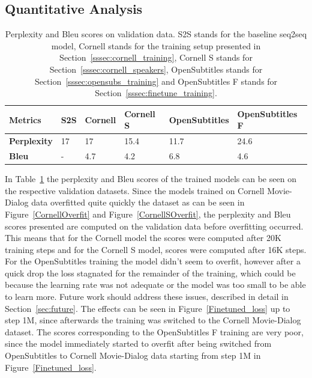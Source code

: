 \documentclass[12pt]{article}
\begin{document}
\subsection{Quantitative Analysis} \label{ssec:51}
\begin{table}[H]
	\centering
	\begin{tabular}{|l|l|l|l|l|l|}
		\hline
		\textbf{Metrics} & \textbf{S2S} & \textbf{Cornell} & \textbf{Cornell S} & \textbf{OpenSubtitles} & \textbf{OpenSubtitles F}\\ \hline
		\textbf{Perplexity} & 17 & 17 & 15.4 & 11.7 & 24.6
		\\ \hline
		\textbf{Bleu} & - & 4.7 & 4.2 & 6.8 & 4.6
		\\ \hline
	\end{tabular}
	\caption{Perplexity and Bleu scores on validation data. S2S stands for the baseline seq2seq model, Cornell stands for the training setup presented in Section~\ref{sssec:cornell_training}, Cornell S stands for Section~\ref{sssec:cornell_speakers}, OpenSubtitles stands for Section~\ref{sssec:opensubs_training} and OpenSubtitles F stands for Section~\ref{sssec:finetune_training}.}	
	\label{table:scores}
\end{table}
In Table~\ref{table:scores} the perplexity and Bleu scores of the trained models can be seen on the respective validation datasets. Since the models trained on Cornell Movie-Dialog data overfitted quite quickly the dataset as can be seen in Figure~\ref{CornellOverfit} and Figure~\ref{CornellSOverfit}, the perplexity and Bleu scores presented are computed on the validation data before overfitting occurred. This means that for the Cornell model the scores were computed after 20K training steps and for the Cornell S model, scores were computed after 16K steps. For the OpenSubtitles training the model didn't seem to overfit, however after a quick drop the loss stagnated for the remainder of the training, which could be because the learning rate was not adequate or the model was too small to be able to learn more. Future work should address these issues, described in detail in Section~\ref{sec:future}. The effects can be seen in Figure~\ref{Finetuned_loss} up to step 1M, since afterwards the training was switched to the Cornell Movie-Dialog dataset. The scores corresponding to the OpenSubtitles F training are very poor, since the model immediately started to overfit after being switched from OpenSubtitles to Cornell Movie-Dialog data starting from step 1M in Figure~\ref{Finetuned_loss}.
\end{document}
